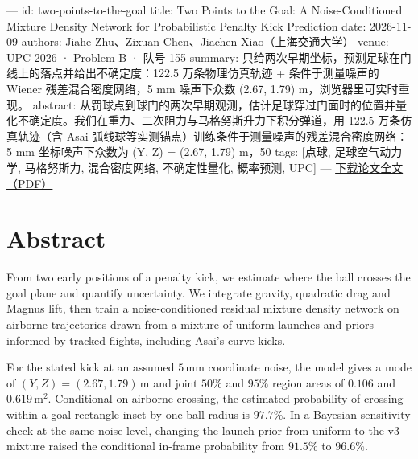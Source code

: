 ---
id: two-points-to-the-goal
title: Two Points to the Goal: A Noise-Conditioned Mixture Density Network for Probabilistic Penalty Kick Prediction
date: 2026-11-09
authors: Jiahe Zhu、Zixuan Chen、Jiachen Xiao（上海交通大学）
venue: UPC 2026 · Problem B · 队号 155
summary: 只给两次早期坐标，预测足球在门线上的落点并给出不确定度：122.5 万条物理仿真轨迹 + 条件于测量噪声的 Wiener 残差混合密度网络，5 mm 噪声下众数 (2.67, 1.79) m，浏览器里可实时重现。
abstract: 从罚球点到球门的两次早期观测，估计足球穿过门面时的位置并量化不确定度。我们在重力、二次阻力与马格努斯升力下积分弹道，用 122.5 万条仿真轨迹（含 Asai 弧线球等实测锚点）训练条件于测量噪声的残差混合密度网络：5 mm 坐标噪声下众数为 (Y, Z) = (2.67, 1.79) m，50%
tags: [点球, 足球空气动力学, 马格努斯力, 混合密度网络, 不确定性量化, 概率预测, UPC]
---
\href{assets/papers/two-points-to-the-goal/two-points-to-the-goal.pdf}{下载论文全文（PDF）}

\section*{Abstract}

From two early positions of a penalty kick, we estimate where the ball crosses the goal plane and quantify uncertainty. We integrate gravity, quadratic drag and Magnus lift, then train a noise-conditioned residual mixture density network on airborne trajectories drawn from a mixture of uniform launches and priors informed by tracked flights, including Asai's curve kicks.

For the stated kick at an assumed $5\,\mathrm{mm}$ coordinate noise, the model gives a mode of $(Y,Z)=(2.67,1.79)\,\mathrm{m}$ and joint $50\%$ and $95\%$ region areas of $0.106$ and $0.619\,\mathrm{m^2}$. Conditional on airborne crossing, the estimated probability of crossing within a goal rectangle inset by one ball radius is $97.7\%$. In a Bayesian sensitivity check at the same noise level, changing the launch prior from uniform to the v3 mixture raised the conditional in-frame probability from $91.5\%$ to $96.6\%$.

